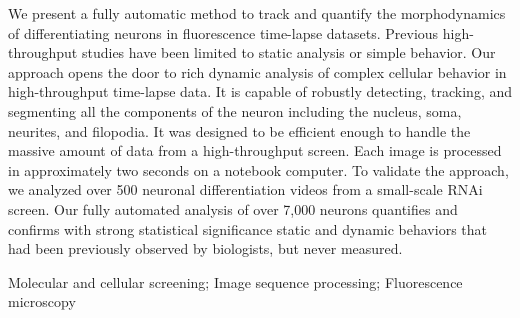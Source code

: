 
We present a fully automatic method to track and
quantify the morphodynamics of differentiating
neurons in fluorescence time-lapse datasets.
Previous high-throughput studies have been limited to
static analysis or simple behavior. Our approach
opens the door to rich dynamic analysis of complex
cellular behavior in high-throughput time-lapse
data. It is capable of robustly detecting,
tracking, and segmenting all the components of the
neuron including the nucleus, soma, neurites, and
filopodia. It was designed to be efficient enough
to handle the massive amount of data from a
high-throughput screen. Each image is processed in
approximately two seconds on a notebook
computer. To validate the approach, we analyzed
over 500 neuronal differentiation videos from a
small-scale RNAi screen. Our fully automated
analysis of over 7,000 neurons quantifies and
confirms with strong statistical significance
static and dynamic behaviors that had been
previously observed by biologists, but never
measured.



\begin{keywords}
Molecular and cellular screening; Image sequence processing; Fluorescence microscopy
\end{keywords}







